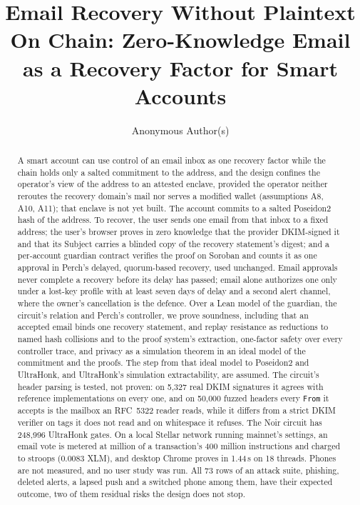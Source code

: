 \documentclass[sigconf,anonymous,review]{acmart}
\begin{document}
\title{Email Recovery Without Plaintext On Chain: Zero-Knowledge Email as a Recovery Factor for Smart Accounts}

\author{Anonymous Author(s)}

\begin{abstract}
A smart account can use control of an email inbox as one recovery factor
while the chain holds only a salted commitment to the address, and the
design confines the operator's view of the address to an attested enclave,
provided the operator neither reroutes the recovery domain's mail nor serves
a modified wallet (assumptions A8, A10, A11); that enclave is not yet
built. The account commits to a salted Poseidon2
hash of the address. To recover, the user sends one email from that inbox to
a fixed address; the user's browser proves in zero knowledge that the
provider DKIM-signed it and that its Subject carries a blinded copy of the
recovery statement's digest; and a per-account guardian contract verifies
the proof on Soroban and counts it as one approval in Perch's delayed,
quorum-based recovery, used unchanged. Email approvals never complete a
recovery before its delay has passed; email alone authorizes one only under
a lost-key profile with at least seven days of delay and a second alert
channel, where the owner's cancellation is the defence. Over a Lean model of
the guardian, the circuit's relation and Perch's controller, we prove
soundness, including that an accepted email binds one recovery statement,
and replay resistance as reductions to named hash collisions and to the
proof system's extraction, one-factor safety over every controller trace,
and privacy as a simulation theorem in an ideal model of the commitment and
the
proofs.
The step from that ideal model to Poseidon2 and UltraHonk, and UltraHonk's
simulation extractability, are assumed.
The circuit's header parsing is tested, not proven: on 5{,}327 real DKIM
signatures it agrees with reference implementations on every one, and on
50{,}000 fuzzed headers every \texttt{From} it accepts is the mailbox an
RFC~5322 reader reads, while it differs from a strict DKIM verifier on tags
it does not read and on whitespace it
refuses. The Noir circuit has
248{,}996 UltraHonk gates. On a local Stellar network
running mainnet's settings, an email vote is metered at
 million of a transaction's 400 million
instructions and charged  to  stroops
(0.0083 XLM), and desktop Chrome proves in 1.44\,s on 18
threads. Phones are not
measured, and no user study was run. All 73 rows of an attack suite,
phishing, deleted alerts, a lapsed push and a switched phone among them, have
their expected outcome, two of them residual risks the design does not
stop.
\end{abstract}
\end{document}
